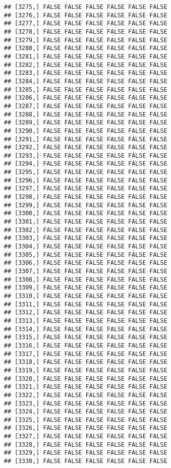 \documentclass[
]{article}
\begin{document}
\begin{verbatim}
## [3275,] FALSE FALSE FALSE FALSE FALSE FALSE
## [3276,] FALSE FALSE FALSE FALSE FALSE FALSE
## [3277,] FALSE FALSE FALSE FALSE FALSE FALSE
## [3278,] FALSE FALSE FALSE FALSE FALSE FALSE
## [3279,] FALSE FALSE FALSE FALSE FALSE FALSE
## [3280,] FALSE FALSE FALSE FALSE FALSE FALSE
## [3281,] FALSE FALSE FALSE FALSE FALSE FALSE
## [3282,] FALSE FALSE FALSE FALSE FALSE FALSE
## [3283,] FALSE FALSE FALSE FALSE FALSE FALSE
## [3284,] FALSE FALSE FALSE FALSE FALSE FALSE
## [3285,] FALSE FALSE FALSE FALSE FALSE FALSE
## [3286,] FALSE FALSE FALSE FALSE FALSE FALSE
## [3287,] FALSE FALSE FALSE FALSE FALSE FALSE
## [3288,] FALSE FALSE FALSE FALSE FALSE FALSE
## [3289,] FALSE FALSE FALSE FALSE FALSE FALSE
## [3290,] FALSE FALSE FALSE FALSE FALSE FALSE
## [3291,] FALSE FALSE FALSE FALSE FALSE FALSE
## [3292,] FALSE FALSE FALSE FALSE FALSE FALSE
## [3293,] FALSE FALSE FALSE FALSE FALSE FALSE
## [3294,] FALSE FALSE FALSE FALSE FALSE FALSE
## [3295,] FALSE FALSE FALSE FALSE FALSE FALSE
## [3296,] FALSE FALSE FALSE FALSE FALSE FALSE
## [3297,] FALSE FALSE FALSE FALSE FALSE FALSE
## [3298,] FALSE FALSE FALSE FALSE FALSE FALSE
## [3299,] FALSE FALSE FALSE FALSE FALSE FALSE
## [3300,] FALSE FALSE FALSE FALSE FALSE FALSE
## [3301,] FALSE FALSE FALSE FALSE FALSE FALSE
## [3302,] FALSE FALSE FALSE FALSE FALSE FALSE
## [3303,] FALSE FALSE FALSE FALSE FALSE FALSE
## [3304,] FALSE FALSE FALSE FALSE FALSE FALSE
## [3305,] FALSE FALSE FALSE FALSE FALSE FALSE
## [3306,] FALSE FALSE FALSE FALSE FALSE FALSE
## [3307,] FALSE FALSE FALSE FALSE FALSE FALSE
## [3308,] FALSE FALSE FALSE FALSE FALSE FALSE
## [3309,] FALSE FALSE FALSE FALSE FALSE FALSE
## [3310,] FALSE FALSE FALSE FALSE FALSE FALSE
## [3311,] FALSE FALSE FALSE FALSE FALSE FALSE
## [3312,] FALSE FALSE FALSE FALSE FALSE FALSE
## [3313,] FALSE FALSE FALSE FALSE FALSE FALSE
## [3314,] FALSE FALSE FALSE FALSE FALSE FALSE
## [3315,] FALSE FALSE FALSE FALSE FALSE FALSE
## [3316,] FALSE FALSE FALSE FALSE FALSE FALSE
## [3317,] FALSE FALSE FALSE FALSE FALSE FALSE
## [3318,] FALSE FALSE FALSE FALSE FALSE FALSE
## [3319,] FALSE FALSE FALSE FALSE FALSE FALSE
## [3320,] FALSE FALSE FALSE FALSE FALSE FALSE
## [3321,] FALSE FALSE FALSE FALSE FALSE FALSE
## [3322,] FALSE FALSE FALSE FALSE FALSE FALSE
## [3323,] FALSE FALSE FALSE FALSE FALSE FALSE
## [3324,] FALSE FALSE FALSE FALSE FALSE FALSE
## [3325,] FALSE FALSE FALSE FALSE FALSE FALSE
## [3326,] FALSE FALSE FALSE FALSE FALSE FALSE
## [3327,] FALSE FALSE FALSE FALSE FALSE FALSE
## [3328,] FALSE FALSE FALSE FALSE FALSE FALSE
## [3329,] FALSE FALSE FALSE FALSE FALSE FALSE
## [3330,] FALSE FALSE FALSE FALSE FALSE FALSE

\end{verbatim}
\end{document}
